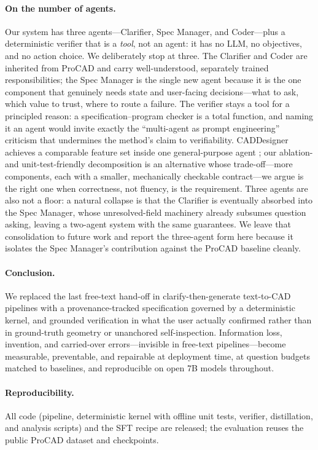 \paragraph{On the number of agents.}
\label{sec:discussion:agents}
Our system has three agents---Clarifier, Spec Manager, and Coder---plus a
deterministic verifier that is a \emph{tool}, not an agent: it has no LLM, no
objectives, and no action choice. We deliberately stop at three. The
Clarifier and Coder are inherited from ProCAD and carry well-understood,
separately trained responsibilities; the Spec Manager is the single new
agent because it is the one component that genuinely needs state and
user-facing decisions---what to ask, which value to trust, where to route a
failure. The verifier stays a tool for a principled reason: a
specification--program checker is a total function, and naming it an agent
would invite exactly the ``multi-agent as prompt engineering'' criticism
that undermines the method's claim to verifiability. CADDesigner achieves a
comparable feature set inside one general-purpose agent \cite{caddesigner};
our ablation- and unit-test-friendly decomposition is an alternative whose
trade-off---more components, each with a smaller, mechanically checkable
contract---we argue is the right one when correctness, not fluency, is the
requirement. Three agents are also not a floor: a natural collapse is that
the Clarifier is eventually absorbed into the Spec Manager, whose
unresolved-field machinery already subsumes question asking, leaving a
two-agent system with the same guarantees. We leave that consolidation to
future work and report the three-agent form here because it isolates the
Spec Manager's contribution against the ProCAD baseline cleanly.

\paragraph{Conclusion.}
We replaced the last free-text hand-off in clarify-then-generate text-to-CAD
pipelines with a provenance-tracked specification governed by a deterministic
kernel, and grounded verification in what the user actually confirmed rather
than in ground-truth geometry or unanchored self-inspection. Information
loss, invention, and carried-over errors---invisible in free-text
pipelines---become measurable, preventable, and repairable at deployment
time, at question budgets matched to baselines, and reproducible on open
7B models throughout.

\paragraph{Reproducibility.}
All code (pipeline, deterministic kernel with offline unit tests, verifier,
distillation, and analysis scripts) and the SFT recipe are released; the
evaluation reuses the public ProCAD dataset and checkpoints.
